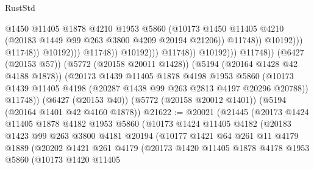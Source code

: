 \begin{lexlean}{RustStd}
\begin{coremodule}
{\begin{coremodule}
{{{{{{{{{{{{{{{{{{{{{{{{{{{{{                                                  @1450
                                                  @11405
                                                  @1878
                                                  @4210
                                                  @1953
                                                  @5860
                                                  (@10173
                                                    @1450
                                                    @11405
                                                    @4210
                                                    (@20183
                                                      @1449
                                                      @99
                                                      @263
                                                      @3800
                                                      @4209
                                                      @20194
                                                      @21206))
                                                  @11748))
                                              @10192)))
                                        @11748))
                                    @10192)))
                              @11748))
                          @10192)))
                    @11748))
                @10192)))
          @11748))
      (@6427 (@20153 @57))
      (@5772 (@20158 @20011 @1428))
      (@5194 (@20164 @1428 @42 @4188 @1878))
      (@20173
        @1439
        @11405
        @1878
        @4198
        @1953
        @5860
        (@10173 @1439 @11405 @4198 (@20287 @1438 @99 @263 @2813 @4197 @20296 @20788))
        @11748))
    (@6427 (@20153 @40))
    (@5772 (@20158 @20012 @1401))
    (@5194 (@20164 @1401 @42 @4160 @1878))
@21622 := @20021
    (@21445
      (@20173
        @1424
        @11405
        @1878
        @4182
        @1953
        @5860
        (@10173
          @1424
          @11405
          @4182
          (@20183
            @1423
            @99
            @263
            @3800
            @4181
            @20194
            (@10177
              @1421
              @64
              @261
              @11
              @4179
              @1889
              (@20202
                @1421
                @261
                @4179
                (@20173
                  @1420
                  @11405
                  @1878
                  @4178
                  @1953
                  @5860
                  (@10173
                    @1420
                    @11405
}}}}}}}}}}}}}}}}}}}}}}}}}}}}}
\end{coremodule}}
\end{coremodule}
\end{lexlean}
